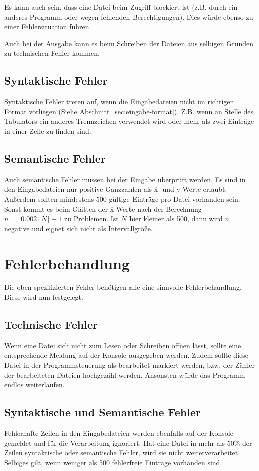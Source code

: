 Es kann auch sein, dass eine Datei beim Zugriff blockiert ist (z.B. durch ein anderes Programm oder wegen fehlenden Berechtigungen).
Dies würde ebenso zu einer Fehlersituation führen.

Auch bei der Ausgabe kann es beim Schreiben der Dateien aus selbigen Gründen zu technischen Fehler kommen.

\subsection{Syntaktische Fehler}\label{subsec:syntaktische-fehler}
Syntaktische Fehler treten auf, wenn die Eingabedateien nicht im richtigen Format vorliegen (Siehe Abschnitt~\ref{sec:eingabe-format}).
Z.B. wenn an Stelle des Tabulators ein anderes Trennzeichen verwendet wird oder mehr als zwei Einträge in einer Zeile zu finden sind.

\subsection{Semantische Fehler}\label{subsec:semantische-fehler}
Auch semantische Fehler müssen bei der Eingabe überprüft werden.
Es sind in den Eingabedateien nur positive Ganzzahlen als \~x- und y-Werte erlaubt.
Außerdem sollten mindestens 500 gültige Einträge pro Datei vorhanden sein.
Sonst kommt es beim Glätten der \~x-Werte nach der Berechnung $n = \lfloor 0.002 \cdot N \rfloor - 1$ zu Problemen.
Ist $N$ hier kleiner als 500, dann wird $n$ negative und eignet sich nicht als Intervallgröße.

\section{Fehlerbehandlung}\label{sec:fehlerbehandlung}
Die oben spezifizierten Fehler benötigen alle eine sinnvolle Fehlerbehandlung.
Diese wird nun festgelegt.

\subsection{Technische Fehler}\label{subsec:technische-fehler-behandlung}
Wenn eine Datei sich nicht zum Lesen oder Schreiben öffnen lässt, sollte eine entsprechende Meldung auf der Konsole ausgegeben werden.
Zudem sollte diese Datei in der Programmsteuerung als bearbeitet markiert werden, bzw. der Zähler der bearbeiteten Dateien hochgezähl werden.
Ansonsten würde das Programm endlos weiterlaufen.

\subsection{Syntaktische und Semantische Fehler}\label{subsec:syntaktische-semant-fehler-behandlung}
Fehlerhafte Zeilen in den Eingabedateien werden ebenfalls auf der Konsole gemeldet und für die Verarbeitung ignoriert.
Hat eine Datei in mehr als 50\% der Zeilen syntaktische oder semantische Fehler, wird sie nicht weiterverarbeitet.
Selbiges gilt, wenn weniger als 500 fehlerfreie Einträge vorhanden sind.



